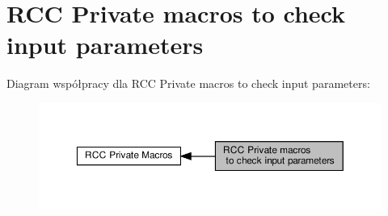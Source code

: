 \hypertarget{group___r_c_c___i_s___r_c_c___definitions}{}\section{R\+CC Private macros to check input parameters}
\label{group___r_c_c___i_s___r_c_c___definitions}
Diagram współpracy dla R\+CC Private macros to check input parameters\+:\nopagebreak
\begin{figure}[H]
\begin{center}
\leavevmode
\includegraphics[width=350pt]{group___r_c_c___i_s___r_c_c___definitions}
\end{center}
\end{figure}
